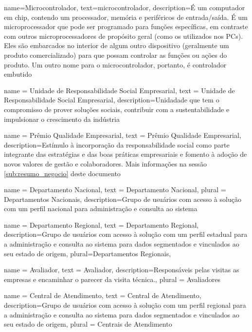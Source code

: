 {
  name=Microcontrolador,
  text=microcontrolador,
  description={É um computador em chip, contendo um processador, memória e periféricos de entrada/saída. É um microprocessador que pode ser programado para funções específicas, em contraste com outros microprocessadores de propósito geral (como os utilizados nos PCs). Eles são embarcados no interior de algum outro dispositivo (geralmente um produto comercializado) para que possam controlar as funções ou ações do produto. Um outro nome para o microcontrolador, portanto, é controlador embutido}
}


{
	name = Unidade de Responsabilidade Social Empresarial,
	text = Unidade de Responsabilidade Social Empresarial,
	description={Unidadade que tem o compromisso de prover soluções sociais, contribuir com a sustentabilidade e impulsionar o crescimento da indústria}
}

{
	name = Prêmio Qualidade Empresarial,
	text = Pr\^emio Qualidade Empresarial,
	description={Estímulo à incorporação da responsabilidade social como parte integrante das estratégias e das boas práticas empresariais e fomento à adoção de novos valores de gestão e colaboradores. Mais informações na sessão \ref{sub:resumo_negocio} deste documento}
}

{
	name = Departamento Nacional,
	text = Departamento Nacional,
	plural = Departamentos Nacionais,
	description={Grupo de usuários com acesso à solução com um perfil nacional para administração e consulta ao sistema}
}

{
	name = Departamento Regional,
	text = Departamento Regional,
	description={Grupo de usuários com acesso à solução com um perfil estadual para a administração e consulta ao sistema para dados segmentados e vinculados ao seu estado de origem},
	plural=Departamentos Regionais,
}

{
	name = Avaliador,
	text = Avaliador,
	description={Responsáveis pelas visitas as empresas e encaminhar o parecer da visita técnica.},
	plural = Avaliadores
}

{
	name = Central de Atendimento,
	text = Central de Atendimento,
	description={Grupo de usuários com acesso à solução com um perfil regional para a administração e consulta ao sistema para dados segmentados e vinculados ao seu estado de origem},
	plural = Centrais de Atendimento
}